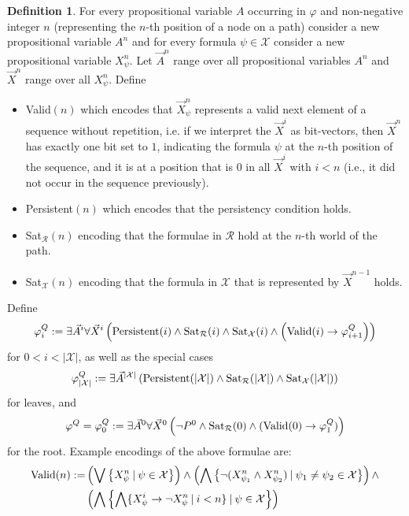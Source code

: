 \documentclass{easychair}
\theoremstyle{definition}
\theoremstyle{definition}
\theoremstyle{definition}
\theoremstyle{definition}
\theoremstyle{definition}
\newtheorem{definition}[theorem]{Definition}
\theoremstyle{definition}
\theoremstyle{definition}
\begin{document}
\begin{definition}
For every propositional variable $A$ occurring in $\varphi$ and non-negative integer $n$ (representing the $n$-th position of a node on a path) consider a new propositional variable $A^n$ and for every formula $\psi\in\mathcal X$ consider a new propositional variable $X_\psi^n$.
Let $\vec A^n$ range over all propositional variables $A^n$ and $\vec X^n$ range over all $X_\psi^n$.
Define
	\begin{itemize}\addtolength{\itemsep}{-5pt}
		\item {\normalfont Valid}$(n)$ which encodes that $\vec X^n_\psi$ represents a valid next element of a sequence without repetition, i.e. if we interpret the $\vec X^i$ as bit-vectors, then $\vec X^n$ has exactly one bit set to $1$, indicating the formula $\psi$ at the $n$-th position of the sequence, and it is at a position that is $0$ in all $\vec X^i$ with $i < n$ (i.e., it did not occur in the sequence previously).
		\item {\normalfont Persistent}$(n)$ which encodes that the persistency condition holds.
		\item {\normalfont Sat}$_{\mathcal R}(n)$ encoding that the formulae in $\mathcal R$ hold at the $n$-th world of the path.
		\item {\normalfont Sat}$_{\mathcal X}(n)$ encoding that the formula in $\mathcal X$ that is represented by $\vec X^{n-1}$ holds.
	\end{itemize}
	Define$$\varphi^Q_{i} := \exists \vec A^i\forall \vec X^i\left(\text{\normalfont Persistent}(i)\wedge \text{\normalfont Sat}_{\mathcal R}(i)\wedge \text{\normalfont Sat}_{\mathcal X}(i)\wedge\left(\text{\normalfont Valid}(i)\to \varphi^Q_{i+1}\right)\right)$$
	for $0 < i < |\mathcal{X}|$, as well as the special cases
	$$\varphi^Q_{|\mathcal{X}|} := \exists \vec A^{|\mathcal{X}|}\left(\text{\normalfont Persistent}(|\mathcal{X}|)\wedge \text{\normalfont Sat}_{\mathcal R}(|\mathcal{X}|)\wedge \text{\normalfont Sat}_{\mathcal X}(|\mathcal{X}|)\right)$$
	for leaves, and $$\varphi^Q = \varphi_0^Q := \exists \vec A^0\forall \vec X^0\left(\neg P^0\wedge \text{\normalfont Sat}_{\mathcal R}(0)\wedge(\text{\normalfont Valid}(0)\to \varphi_1^Q)\right)$$for the root.
	Example encodings of the above formulae are:
	\begin{align*}
		\text{\normalfont Valid}(n) := &\left(\bigvee\left\{X^n_\psi\:|\:\psi\in\mathcal X\right\}\right)\wedge\left(\bigwedge \left\{\neg(X^n_{\psi_1}\wedge X^n_{\psi_2})\:|\:\psi_1\neq\psi_2\in\mathcal X\right\}\right)\wedge\\&\left(\bigwedge\left\{\bigwedge\{X^i_\psi\to\neg X^n_\psi\:|\:i < n\}\:|\:\psi\in\mathcal X\right\}\right)\\

\end{align*}
\end{definition}
\end{document}
